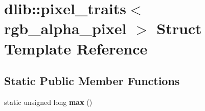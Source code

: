 \hypertarget{structdlib_1_1pixel__traits_3_01rgb__alpha__pixel_01_4}{
\section{dlib::pixel\_\-traits$<$ rgb\_\-alpha\_\-pixel $>$ Struct Template Reference}
\label{structdlib_1_1pixel__traits_3_01rgb__alpha__pixel_01_4}
}
\subsection*{Static Public Member Functions}
\begin{DoxyCompactItemize}
\item 
\hypertarget{structdlib_1_1pixel__traits_3_01rgb__alpha__pixel_01_4_a8e618969b2c20aaf3104bbae4dcff575}{
static unsigned long {\bfseries max} ()}
\label{structdlib_1_1pixel__traits_3_01rgb__alpha__pixel_01_4_a8e618969b2c20aaf3104bbae4dcff575}

\end{DoxyCompactItemize}

